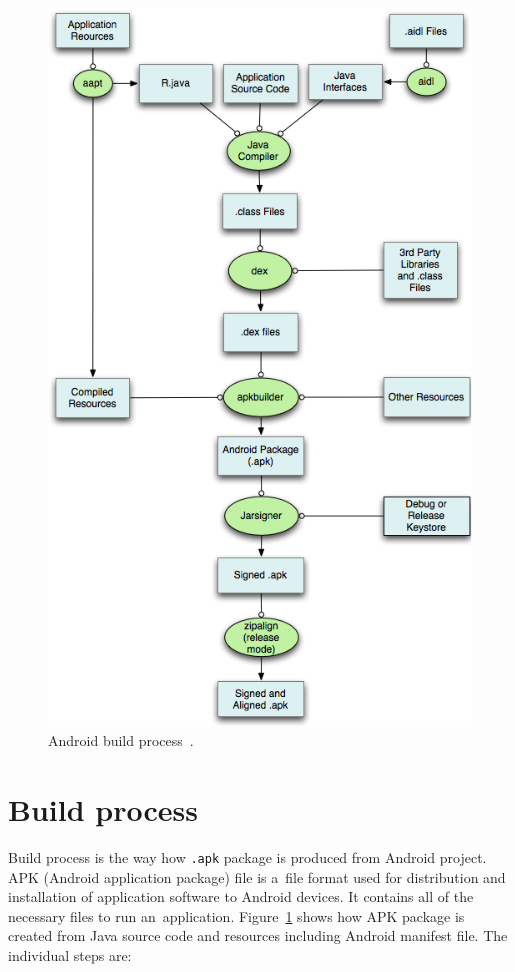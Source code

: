 \begin{figure}[h!]
    \centering
    \includegraphics[scale=0.5]{fig/build.png}
    \caption{Android build process~\cite{AndroidDev}.}
    \label{BuildProcessFigure}
\end{figure}

\section{Build process}\label{BuildProcessSection}
Build process is the way how \texttt{.apk} package is produced from Android project. APK (Android application package)
file is a~file format used for distribution and installation of application software to Android devices. It contains all
of the necessary files to run an~application. Figure~\ref{BuildProcessFigure} shows how APK package is created from
Java source code and resources including Android manifest file. The individual steps are:

